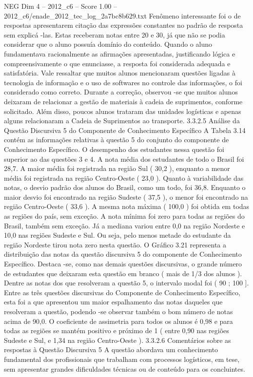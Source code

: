 \begin{textsample}{NEG Dim 4 – 2012\_c6 – Score 1.00 – 2012\_c6/enade\_2012\_tec\_log\_2a7bc8b629.txt}
Fenômeno interessante foi o de respostas apresentarem citação das expressões constantes no padrão de resposta sem explicá -las.
Estas receberam notas entre 20 e 30, já que não se podia considerar que o aluno possuía domínio do conteúdo.
Quando o aluno fundamentava racionalmente as afirmações apresentadas, justificando lógica e compreensivamente o que enunciasse, a resposta foi considerada adequada e satisfatória.
Vale ressaltar que muitos alunos mencionaram questões ligadas à tecnologia de informação e o uso de softwares no controle das informações, o foi considerado como correto.
Durante a correção, observou -se que muitos alunos deixaram de relacionar a gestão de materiais à cadeia de suprimentos, conforme solicitado.
Além disso, poucos alunos trataram das unidades logísticas e apenas alguns relacionaram a Cadeia de Suprimentos ao transporte. 3.3.2.5 Análise da Questão Discursiva 5 do Componente de Conhecimento Específico A Tabela 3.14 contém as informações relativas à questão 5 do conjunto do componente de Conhecimento Específico.
O desempenho dos estudantes nessa questão foi superior ao das questões 3 e 4.
A nota média dos estudantes de todo o Brasil foi 28,7.
A maior média foi registrada na região Sul ( 30,2 ), enquanto a menor média foi registrada na região Centro-Oeste ( 23,0 ).
Quanto à variabilidade das notas, o desvio padrão dos alunos do Brasil, como um todo, foi 36,8.
Enquanto o maior desvio foi encontrado na região Sudeste ( 37,5 ), o menor foi encontrado na região Centro-Oeste ( 33,6 ).
A mesma nota máxima ( 100,0 ) foi obtida em todas as regiões do país, sem exceção.
A nota mínima foi zero para todas as regiões do Brasil, também sem exceção.
Já a mediana variou entre 0,0 na região Nordeste e 10,0 nas regiões Sudeste e Sul.
Ou seja, pelo menos metade do estudante da região Nordeste tirou nota zero nesta questão.
O Gráfico 3.21 representa a distribuição das notas da questão discursiva 5 do componente de Conhecimento Específico.
Destaca -se, como nas demais questões discursivas, o grande número de estudantes que deixaram esta questão em branco ( mais de 1/3 dos alunos ).
Dentre as notas dos que resolveram a questão 5, o intervalo modal foi ( 90 ; 100 ].
Entre as três questões discursivas do Componente de Conhecimento Específico, esta foi a que apresentou um maior espalhamento das notas daqueles que resolveram a questão, podendo -se observar também o bom número de notas acima de 90,0.
O coeficiente de assimetria para todos os alunos é 0,98 e para todas as regiões se mantém positivo e próximo de 1 ( entre 0,90 nas regiões Sudeste e Sul, e 1,34 na região Centro-Oeste ). 3.3.2.6 Comentários sobre as respostas à Questão Discursiva 5 A questão abordava um conhecimento fundamental dos profissionais que trabalham com processos logísticos, em tese, sem apresentar grandes dificuldades técnicas ou de conteúdo para os concluintes.

\end{textsample}
